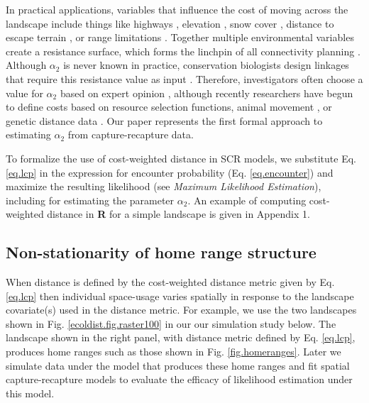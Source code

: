\documentclass[12pt]{article}
\begin{document}
\begin{spacing}{1.8}
In practical applications, variables that influence the cost of moving
across the landscape include things like highways
\citep[e.g.,][]{epps_etal:2005}, elevation \citep{cushman_etal:2006},
 snow cover
\citep{schwartz_etal:2009}, distance to escape terrain
\citep{shirk_etal:2010}, or range limitations
\citep{mcrae_beier:2007}.  Together multiple environmental variables
create a resistance surface, which forms the linchpin of all
connectivity planning \citep{spear_etal:2010}.
 Although $\alpha_{2}$ is never known in practice,
conservation biologists design linkages that require this resistance
value as input \citep[see][and articles cited
therein]{beier_etal:2008}.
Therefore, investigators often choose a value for $\alpha_{2}$
based on
expert opinion \citep{beier_etal:2008}, although recently researchers
have begun to define costs based on resource selection functions,
animal movement \citep{tracy:2006, fortin_etal:2005}, or genetic
distance data \citep{gerlach_musolf:2000,
schwartz_etal:2009}. Our paper represents the first formal approach
to estimating $\alpha_{2}$ from capture-recapture data.

To formalize the use of cost-weighted distance in SCR models, we
substitute Eq. \ref{eq.lcp} in the expression for encounter
probability (Eq. \ref{eq.encounter}) and maximize the resulting
likelihood (see {\it Maximum Likelihood Estimation}), including for estimating the
parameter $\alpha_{2}$. An example of computing cost-weighted distance
in {\bf R} for a simple landscape is given in Appendix 1.


\subsection{Non-stationarity of home range structure}

When distance is defined by the cost-weighted distance metric given
by Eq. \ref{eq.lcp} then individual space-usage varies
spatially in response to the landscape covariate(s) used in the
distance metric. For example, we use the two landscapes shown in
Fig. \ref{ecoldist.fig.raster100}
in our
our simulation study below. The landscape shown in the right panel, with
distance
metric defined by Eq. \ref{eq.lcp}, produces home ranges such
as those shown in Fig. \ref{fig.homeranges}. Later we simulate data
under the model that produces these home ranges and fit spatial
capture-recapture models to evaluate the efficacy of likelihood
estimation under this model.





\end{spacing}
\end{document}
